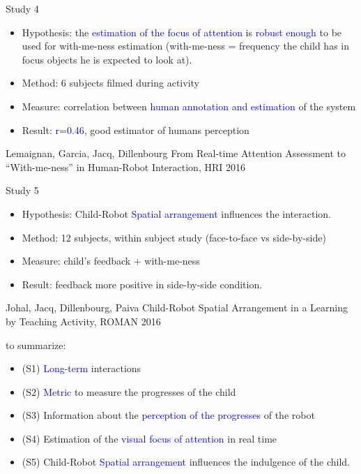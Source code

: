 \documentclass[compress]{beamer}
\renewcommand{\bf}{\Medium}
\begin{document}
\begin{frame}{Study 4}
    \begin{itemize}
    \item {\bf Hypothesis}: the \textcolor{blue}{estimation of the focus of attention} is \textcolor{blue}{robust enough} to be used for {\bf with-me-ness} estimation (with-me-ness = frequency the child has in focus objects he is expected to look at).
    \item {\bf Method}: 6 subjects filmed during activity
    \item {\bf Measure}: correlation between \textcolor{blue}{human annotation and estimation} of the system
    \item {\bf Result}: \textcolor{blue}{r=0.46}, good estimator of humans perception\\
    \end{itemize}
    
\tiny{Lemaignan, Garcia, Jacq, Dillenbourg {\bf From Real-time Attention Assessment to “With-me-ness” in Human-Robot Interaction}, HRI 2016}
\end{frame}

\begin{frame}{Study 5}
    \begin{itemize}
    \item {\bf Hypothesis}: Child-Robot \textcolor{blue}{Spatial arrangement} influences the interaction.
    \item {\bf Method}: 12 subjects, within subject study (face-to-face vs side-by-side)
    \item {\bf Measure}: child's feedback + with-me-ness
    \item {\bf Result}: feedback more positive in side-by-side condition.\\ %
    \end{itemize}
    
\tiny{Johal, Jacq, Dillenbourg, Paiva {\bf Child-Robot Spatial Arrangement in a Learning by Teaching Activity}, ROMAN 2016}
\end{frame}

\begin{frame}

{\bf to summarize}:
\begin{itemize}
\item (S1) \textcolor{blue}{Long-term} interactions
\item (S2) \textcolor{blue}{Metric} to measure the progresses of the child
\item (S3) Information about the \textcolor{blue}{perception of the progresses} of the robot %
\item (S4) Estimation of the \textcolor{blue}{visual focus of attention} in real time
\item (S5) Child-Robot \textcolor{blue}{Spatial arrangement} influences the indulgence of the child. 
\end{itemize}
\end{frame}
\end{document}
